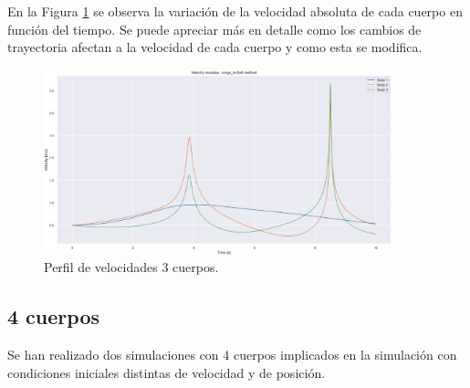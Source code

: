 \documentclass[12pt,a4paper]{article}
\begin{document}
En la Figura \ref{3_body_vel} se observa la variación de la velocidad absoluta de cada cuerpo en función del tiempo. Se puede apreciar más en detalle como los cambios de trayectoria afectan a la velocidad de cada cuerpo y como esta se modifica.
\begin{figure}[H]
	\centering
	\includegraphics[width=0.90\textwidth]{FIGURES/mil5/3nb_vel.png}
	\caption{Perfil de velocidades 3 cuerpos.}
	\label{3_body_vel}
\end{figure}


\subsection{4 cuerpos}
Se han realizado dos simulaciones con 4 cuerpos implicados en la simulación con condiciones iniciales distintas de velocidad y de posición. 
\end{document}
